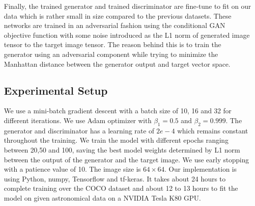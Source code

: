 \documentclass{article} %
\begin{document}
    \hspace*{0.25 in}Finally, the trained generator and trained discriminator are fine-tune to fit on our data which is rather small in size compared to the previous datasets. These networks are trained in an adversarial fashion using the conditional GAN objective function \citep{isola2018imagetoimage} with some noise introduced as the L1 norm of generated image tensor to the target image tensor. The reason behind this is to train the generator using an adversarial component while trying to minimize the Manhattan distance between the generator output and target vector space.
    \subsection{Experimental Setup}
    \hspace*{0.25 in}We use a mini-batch gradient descent with a batch size of 10, 16 and 32 for different iterations. We use Adam optimizer with $\beta_1 = 0.5$ and $\beta_2 = 0.999$. The generator and discriminator has a learning rate of $2e-4$ which remains constant throughout the training. We train the model with different epochs ranging between 20,50 and 100, saving the best model weights determined by L1 norm between the output of the generator and the target image. We use early stopping with a patience value of 10. The image size is $64\times64$. Our implementation is using Python, numpy, Tensorflow and tf-keras. It takes about 24 hours to complete training over the COCO dataset and about 12 to 13 hours to fit the model on given astronomical data on a NVIDIA Tesla K80 GPU.
    
\end{document}
